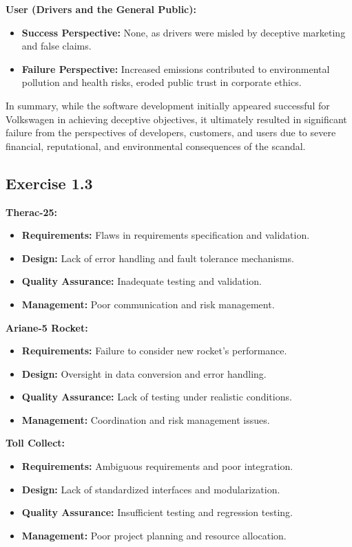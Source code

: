 \documentclass[a4paper]{scrartcl}
\begin{document}
\textbf{User (Drivers and the General Public):}
\begin{itemize}
  \item \textbf{Success Perspective:} None, as drivers were misled by deceptive marketing and false claims.
  \item \textbf{Failure Perspective:} Increased emissions contributed to environmental pollution and health risks, eroded public trust in corporate ethics.
\end{itemize}
In summary, while the software development initially appeared successful for Volkswagen in achieving deceptive objectives, it ultimately resulted in significant
failure from the perspectives of developers, customers, and users due to severe financial, reputational, and environmental consequences of the scandal.

\newpage

\subsection*{Exercise 1.3}
\textbf{Therac-25:}
\begin{itemize}
  \item \textbf{Requirements:} Flaws in requirements specification and validation.
  \item \textbf{Design:} Lack of error handling and fault tolerance mechanisms.
  \item \textbf{Quality Assurance:} Inadequate testing and validation.
  \item \textbf{Management:} Poor communication and risk management.
\end{itemize}

\textbf{Ariane-5 Rocket:}
\begin{itemize}
  \item \textbf{Requirements:} Failure to consider new rocket's performance.
  \item \textbf{Design:} Oversight in data conversion and error handling.
  \item \textbf{Quality Assurance:} Lack of testing under realistic conditions.
  \item \textbf{Management:} Coordination and risk management issues.
\end{itemize}

\textbf{Toll Collect:}
\begin{itemize}
  \item \textbf{Requirements:} Ambiguous requirements and poor integration.
  \item \textbf{Design:} Lack of standardized interfaces and modularization.
  \item \textbf{Quality Assurance:} Insufficient testing and regression testing.
  \item \textbf{Management:} Poor project planning and resource allocation.
\end{itemize}
\end{document}
